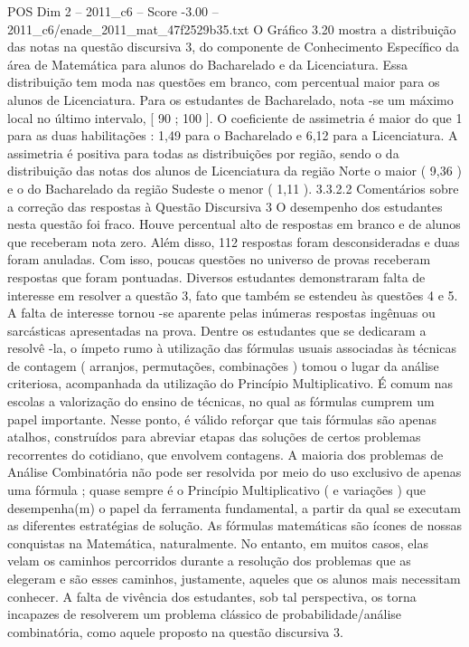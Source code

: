 \begin{textsample}{POS Dim 2 – 2011\_c6 – Score -3.00 – 2011\_c6/enade\_2011\_mat\_47f2529b35.txt}
O Gráfico 3.20 mostra a distribuição das notas na questão discursiva 3, do componente de Conhecimento Específico da área de Matemática para alunos do Bacharelado e da Licenciatura.
Essa distribuição tem moda nas questões em branco, com percentual maior para os alunos de Licenciatura.
Para os estudantes de Bacharelado, nota -se um máximo local no último intervalo, [ 90 ; 100 ].
O coeficiente de assimetria é maior do que 1 para as duas habilitações : 1,49 para o Bacharelado e 6,12 para a Licenciatura.
A assimetria é positiva para todas as distribuições por região, sendo o da distribuição das notas dos alunos de Licenciatura da região Norte o maior ( 9,36 ) e o do Bacharelado da região Sudeste o menor ( 1,11 ). 3.3.2.2 Comentários sobre a correção das respostas à Questão Discursiva 3 O desempenho dos estudantes nesta questão foi fraco.
Houve percentual alto de respostas em branco e de alunos que receberam nota zero.
Além disso, 112 respostas foram desconsideradas e duas foram anuladas.
Com isso, poucas questões no universo de provas receberam respostas que foram pontuadas.
Diversos estudantes demonstraram falta de interesse em resolver a questão 3, fato que também se estendeu às questões 4 e 5.
A falta de interesse tornou -se aparente pelas inúmeras respostas ingênuas ou sarcásticas apresentadas na prova.
Dentre os estudantes que se dedicaram a resolvê -la, o ímpeto rumo à utilização das fórmulas usuais associadas às técnicas de contagem ( arranjos, permutações, combinações ) tomou o lugar da análise criteriosa, acompanhada da utilização do Princípio Multiplicativo.
É comum nas escolas a valorização do ensino de técnicas, no qual as fórmulas cumprem um papel importante.
Nesse ponto, é válido reforçar que tais fórmulas são apenas atalhos, construídos para abreviar etapas das soluções de certos problemas recorrentes do cotidiano, que envolvem contagens.
A maioria dos problemas de Análise Combinatória não pode ser resolvida por meio do uso exclusivo de apenas uma fórmula ; quase sempre é o Princípio Multiplicativo ( e variações ) que desempenha(m) o papel da ferramenta fundamental, a partir da qual se executam as diferentes estratégias de solução.
As fórmulas matemáticas são ícones de nossas conquistas na Matemática, naturalmente.
No entanto, em muitos casos, elas velam os caminhos percorridos durante a resolução dos problemas que as elegeram e são esses caminhos, justamente, aqueles que os alunos mais necessitam conhecer.
A falta de vivência dos estudantes, sob tal perspectiva, os torna incapazes de resolverem um problema clássico de probabilidade/análise combinatória, como aquele proposto na questão discursiva 3.

\end{textsample}
